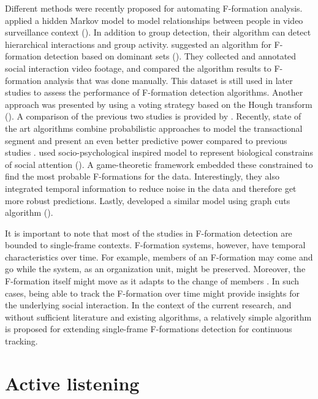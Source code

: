 \documentclass[]{simple-thesis}
\begin{document}
Different methods were recently proposed for automating F-formation analysis.
\citeauthor{Lin2010} applied a hidden Markov model to model relationships between people in video surveillance context (\citeyear{Lin2010}).
In addition to group detection, their algorithm can detect hierarchical interactions and group activity.
\citeauthor{Hung2011} suggested an algorithm for F-formation detection based on dominant sets (\citeyear{Hung2011}).
They collected and annotated social interaction video footage, and compared the algorithm results to F-formation analysis that was done manually.
This dataset is still used in later studies to assess the performance of F-formation detection algorithms.
Another approach was presented by \citeauthor{Cristani2011} using a voting strategy based on the Hough transform (\citeyear{Cristani2011}).
A comparison of the previous two studies is provided by \cite{Setti2013}.
Recently, state of the art algorithms combine probabilistic approaches to model the transactional segment and present an even better predictive power compared to previous studies \citep{Vascon2014, Setti2015}.
\citeauthor{Vascon2014} used socio-psychological inspired model to represent biological constrains of social attention (\citeyear{Vascon2014}).
A game-theoretic framework embedded these constrained to find the most probable F-formations for the data.
Interestingly, they also integrated temporal information to reduce noise in the data and therefore get more robust predictions.
Lastly, \citeauthor{Setti2015} developed a similar model using graph cuts algorithm (\citeyear{Setti2015}).

It is important to note that most of the studies in F-formation detection are bounded to single-frame contexts.
F-formation systems, however, have temporal characteristics over time.
For example, members of an F-formation may come and go while the system, as an organization unit, might be preserved.
Moreover, the F-formation itself might move as it adapts to the change of members \citep{Kendon1990}.
In such cases, being able to track the F-formation over time might provide insights for the underlying social interaction.
In the context of the current research, and without sufficient literature and existing algorithms, a relatively simple algorithm is proposed for extending single-frame F-formations detection for continuous tracking.

\section{Active listening}
\end{document}
